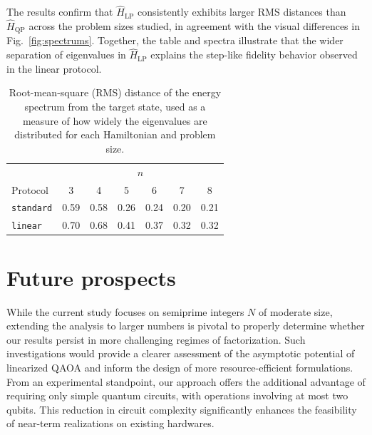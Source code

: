 The results confirm that $\hat{H}_\mathrm{LP}$ consistently exhibits larger RMS distances than $\hat{H}_\mathrm{QP}$ across the problem sizes studied, in agreement with the visual differences in Fig.~\ref{fig:spectrums}. Together, the table and spectra illustrate that the wider separation of eigenvalues in $\hat{H}_\mathrm{LP}$ explains the step-like fidelity behavior observed in the linear protocol.

\begin{table}[h]
    \centering
    \begin{tabular}{@{}lcccccc@{}}
        \toprule
        & \multicolumn{6}{c}{$n$} \\
        \cmidrule(lr){2-7}
        Protocol            & 3     & 4     & 5     & 6     & 7     & 8 \\
        \midrule
        \texttt{standard}   & 0.59  & 0.58  & 0.26  & 0.24  & 0.20  & 0.21 \\
        \texttt{linear}     & 0.70  & 0.68  & 0.41  & 0.37  & 0.32  & 0.32 \\
        \bottomrule
    \end{tabular}
    \caption{Root-mean-square (RMS) distance of the energy spectrum from the target state, used as a measure of how widely the eigenvalues are distributed for each Hamiltonian and problem size.}
    \label{table:rms}
\end{table}

\section{Future prospects}

While the current study focuses on semiprime integers $N$ of moderate size, extending the analysis to larger numbers is pivotal to properly determine whether our results persist in more challenging regimes of factorization. Such investigations would provide a clearer assessment of the asymptotic potential of linearized QAOA and inform the design of more resource-efficient formulations. From an experimental standpoint, our approach offers the additional advantage of requiring only simple quantum circuits, with operations involving at most two qubits. This reduction in circuit complexity significantly enhances the feasibility of near-term realizations on existing hardwares.
